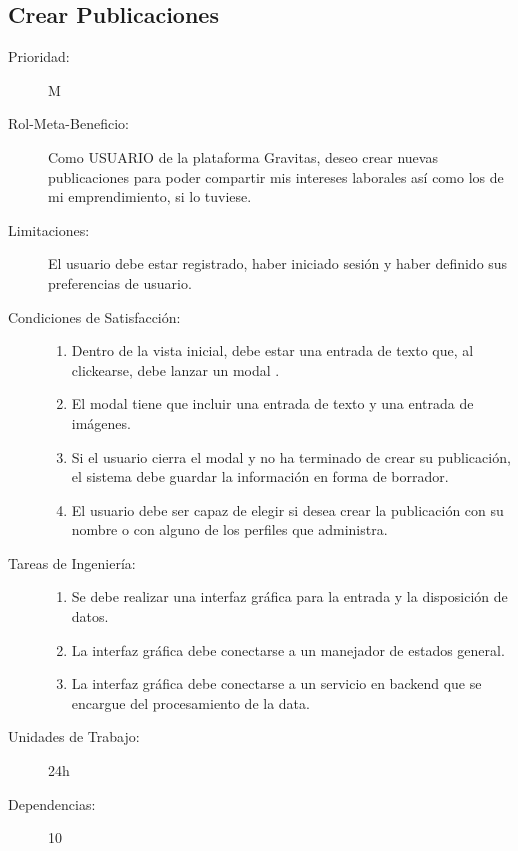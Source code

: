 \newpage


\subsection{Crear Publicaciones}

\begin{description}
    \item[Prioridad:] M
    \item[Rol-Meta-Beneficio:] Como USUARIO de la plataforma Gravitas, deseo  crear nuevas publicaciones para poder compartir mis intereses laborales así como los de mi emprendimiento, si lo tuviese. 
    \item[Limitaciones:] El usuario debe estar registrado, haber iniciado sesión y haber definido sus preferencias de usuario.
    \item[Condiciones de Satisfacción:]  \hfill
        \begin{enumerate}
            \item Dentro de la vista inicial, debe estar una entrada de texto que, al clickearse, debe lanzar un modal .
		    \item El modal tiene que incluir una entrada de texto y una entrada de imágenes.
		    \item Si el usuario cierra el modal y no ha terminado de crear su publicación, el sistema debe guardar la información en forma de borrador.
		    \item El usuario debe ser capaz de elegir si desea crear la publicación con su nombre o con alguno de los perfiles que administra.
        \end{enumerate}
    \item[Tareas de Ingeniería:]  \hfill
        \begin{enumerate}
            \item	Se debe realizar una interfaz gráfica para la entrada y la disposición de datos.
		    \item La interfaz gráfica debe conectarse a un manejador de estados general.
		    \item La interfaz gráfica debe conectarse a un servicio en backend que se encargue del procesamiento de la data.
        \end{enumerate}
    \item[Unidades de Trabajo:] 24h
    \item[Dependencias:] 10
\end{description}

\newpage

